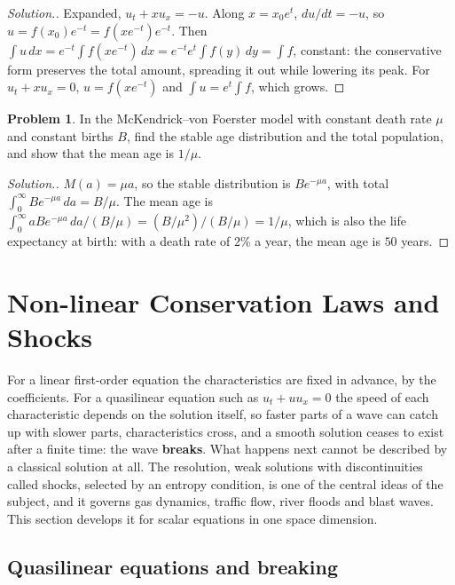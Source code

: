 \documentclass[11pt,a4paper]{article}
\numberwithin{equation}{section}
\theoremstyle{definition}
\newtheorem{problemx}{Problem}[subsection]
\newenvironment{problem}{\begin{problemx}}{\end{problemx}}
\newenvironment{solution}
  {\renewcommand{\qedsymbol}{}\begin{proof}[\textit{Solution}.]}
  {\end{proof}}
\begin{document}
\begin{solution}
Expanded, $u_t + xu_x = -u$. Along $x = x_0e^t$, $du/dt = -u$, so $u = f(x_0)e^{-t} = f(xe^{-t})e^{-t}$. Then $\int u\,dx = e^{-t}\int f(xe^{-t})\,dx = e^{-t}e^t\int f(y)\,dy = \int f$, constant: the conservative form preserves the total amount, spreading it out while
lowering its peak. For $u_t + xu_x = 0$, $u = f(xe^{-t})$ and $\int u = e^t\int f$, which grows.
\end{solution}

\begin{problem}
In the McKendrick--von Foerster model with constant death rate $\mu$ and constant births $B$, find the stable age distribution and the total population, and show that the mean age is $1/\mu$.
\end{problem}

\begin{solution}
$M(a) = \mu a$, so the stable distribution is $Be^{-\mu a}$, with total $\int_0^\infty Be^{-\mu a}\,da = B/\mu$. The mean age is $\int_0^\infty aBe^{-\mu a}\,da/(B/\mu) = (B/\mu^2)/(B/\mu) = 1/\mu$, which is also the life expectancy at birth: with a death rate of $2\%$ a year,
the mean age is $50$ years.
\end{solution}

\section{Non-linear Conservation Laws and Shocks}
\label{sec:shocks}

For a linear first-order equation the characteristics are fixed in advance, by the coefficients. For a quasilinear equation such as $u_t + uu_x = 0$ the
speed of each characteristic depends on the solution itself, so faster parts of a wave can catch up with slower parts, characteristics cross, and a
smooth solution ceases to exist after a finite time: the wave \textbf{breaks}. What happens next cannot be described by a classical solution at all.
The resolution, weak solutions with discontinuities called shocks, selected by an entropy condition, is one of the central ideas of the subject, and it
governs gas dynamics, traffic flow, river floods and blast waves. This section develops it for scalar equations in one space dimension.

\subsection{Quasilinear equations and breaking}
\label{ssec:quasilinear}
\end{document}
